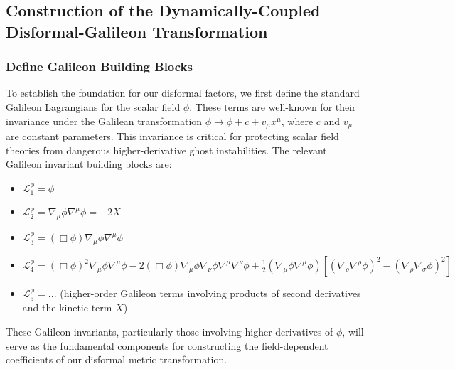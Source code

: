 \documentclass[twocolumn]{aastex631}
\begin{document}
\subsection{Construction of the Dynamically-Coupled Disformal-Galileon Transformation}

\subsubsection{Define Galileon Building Blocks}
To establish the foundation for our disformal factors, we first define the standard Galileon Lagrangians for the scalar field $\phi$. These terms are well-known for their invariance under the Galilean transformation $\phi \rightarrow \phi + c + v_\mu x^\mu$, where $c$ and $v_\mu$ are constant parameters. This invariance is critical for protecting scalar field theories from dangerous higher-derivative ghost instabilities. The relevant Galileon invariant building blocks are:
\begin{itemize}
    \item $\mathcal{L}_1^\phi = \phi$
    \item $\mathcal{L}_2^\phi = \nabla_\mu \phi \nabla^\mu \phi = -2X$
    \item $\mathcal{L}_3^\phi = (\Box \phi) \nabla_\mu \phi \nabla^\mu \phi$
    \item $\mathcal{L}_4^\phi = (\Box\phi)^2 \nabla_\mu \phi \nabla^\mu \phi - 2(\Box\phi) \nabla_\mu \phi \nabla_\nu \phi \nabla^\mu \nabla^\nu \phi + \frac{1}{2} (\nabla_\mu \phi \nabla^\mu \phi) [(\nabla_\rho \nabla^\rho \phi)^2 - (\nabla_\rho \nabla_\sigma \phi)^2]$
    \item $\mathcal{L}_5^\phi = ...$ (higher-order Galileon terms involving products of second derivatives and the kinetic term $X$)
\end{itemize}
These Galileon invariants, particularly those involving higher derivatives of $\phi$, will serve as the fundamental components for constructing the field-dependent coefficients of our disformal metric transformation.
\end{document}
